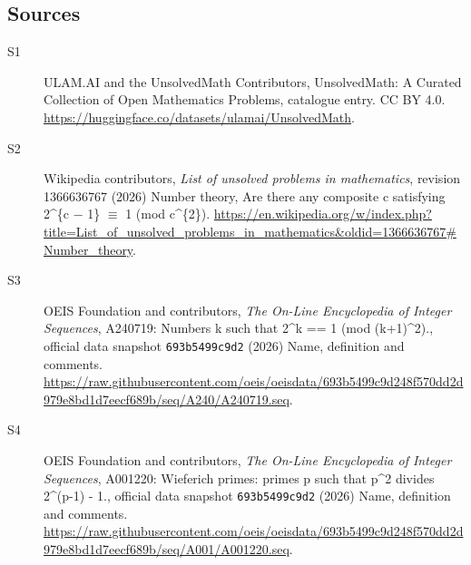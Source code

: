 \documentclass[11pt]{article}
\begin{document}
\subsection{Sources}
\begin{description}
\item[\hypertarget{source:statement:1}{S1}] ULAM.AI and the UnsolvedMath Contributors, UnsolvedMath: A Curated Collection of Open Mathematics Problems, catalogue entry. CC BY 4.0. \url{https://huggingface.co/datasets/ulamai/UnsolvedMath}.
\item[\hypertarget{source:statement:2}{S2}] Wikipedia contributors, \emph{List of unsolved problems in mathematics}, revision 1366636767 (2026) Number theory, Are there any composite c satisfying 2\textasciicircum{}\{c − 1\} $\equiv$ 1 (mod c\textasciicircum{}\{2\}). \url{https://en.wikipedia.org/w/index.php?title=List_of_unsolved_problems_in_mathematics&oldid=1366636767#Number_theory}.
\item[\hypertarget{source:statement:3}{S3}] OEIS Foundation and contributors, \emph{The On-Line Encyclopedia of Integer Sequences}, A240719: Numbers k such that 2\textasciicircum{}k == 1 (mod (k+1)\textasciicircum{}2)., official data snapshot \texttt{693b5499c9d2} (2026) Name, definition and comments. \url{https://raw.githubusercontent.com/oeis/oeisdata/693b5499c9d248f570dd2d979e8bd1d7eecf689b/seq/A240/A240719.seq}.
\item[\hypertarget{source:statement:4}{S4}] OEIS Foundation and contributors, \emph{The On-Line Encyclopedia of Integer Sequences}, A001220: Wieferich primes: primes p such that p\textasciicircum{}2 divides 2\textasciicircum{}(p-1) - 1., official data snapshot \texttt{693b5499c9d2} (2026) Name, definition and comments. \url{https://raw.githubusercontent.com/oeis/oeisdata/693b5499c9d248f570dd2d979e8bd1d7eecf689b/seq/A001/A001220.seq}.
\end{description}
\label{end:statement}
\end{document}
